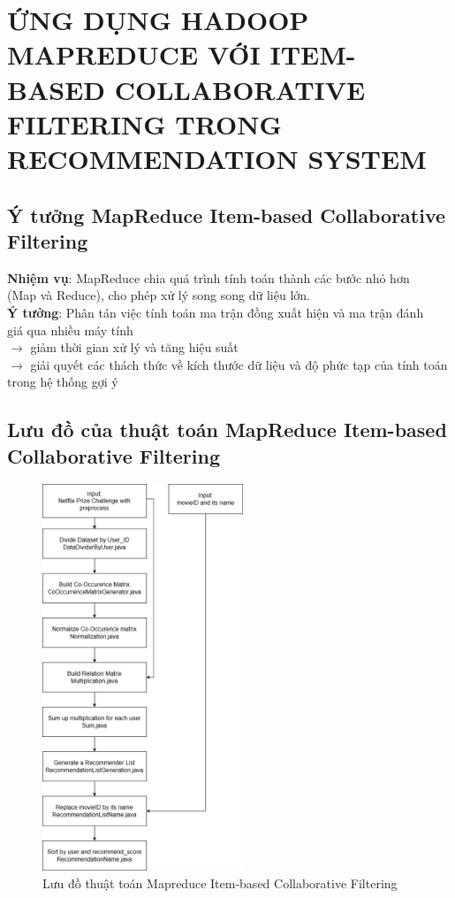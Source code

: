 
\chapter[ỨNG DỤNG HADOOP MAPREDUCE VỚI ITEM-BASED COLLABORATIVE FILTERING TRONG RECOMMENDATION SYSTEM]
{\LARGE ỨNG DỤNG HADOOP MAPREDUCE VỚI ITEM-BASED COLLABORATIVE FILTERING TRONG RECOMMENDATION SYSTEM}
\vspace{-1cm}
\section{Ý tưởng MapReduce Item-based Collaborative Filtering}
\textbf{Nhiệm vụ}: MapReduce chia quá trình tính toán thành các bước nhỏ hơn \\
\hspace*{2cm}(Map và Reduce), cho phép xử lý song song dữ liệu lớn. \\
\vspace{0.5cm}
\textbf{Ý tưởng}: Phân tán việc tính toán ma trận đồng xuất hiện và ma trận đánh \\
\hspace*{1.7cm}giá qua nhiều máy tính \\
\hspace*{1.7cm}$\rightarrow$ giảm thời gian xử lý và tăng hiệu suất \\
\hspace*{1.7cm}$\rightarrow$ giải quyết các thách thức về kích thước dữ liệu và độ phức tạp của tính toán trong hệ thống gợi ý

\section{Lưu đồ của thuật toán MapReduce Item-based Collaborative Filtering}
\vspace*{-1cm}
\begin{figure}[ht]
    \centering
    \includegraphics[width=6cm]{images/RecommenderSystem.png}
    \caption{Lưu đồ thuật toán Mapreduce Item-based Collaborative Filtering}
\end{figure}

